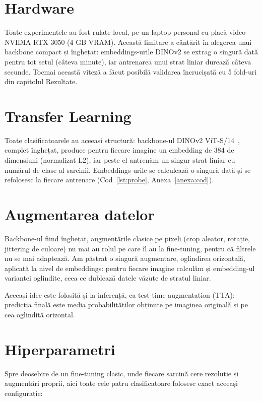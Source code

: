 \documentclass[12pt, a4paper, openany]{book}
\begin{document}
\section{Hardware}

Toate experimentele au fost rulate local, pe un laptop personal cu placă video NVIDIA RTX 3050 (4 GB VRAM). Această limitare a cântărit în alegerea unui backbone compact și înghețat: embeddings-urile DINOv2 se extrag o singură dată pentru tot setul (câteva minute), iar antrenarea unui strat liniar durează câteva secunde. Tocmai această viteză a făcut posibilă validarea încrucișată cu 5 fold-uri din capitolul Rezultate.
\section{Transfer Learning}

Toate clasificatoarele au aceeași structură: backbone-ul DINOv2 ViT-S/14~\cite{oquab2023dinov2}, complet înghețat, produce pentru fiecare imagine un embedding de 384 de dimensiuni (normalizat L2), iar peste el antrenăm un singur strat liniar cu numărul de clase al sarcinii. Embeddings-urile se calculează o singură dată și se refolosesc la fiecare antrenare (Cod~\ref{lst:probe}, Anexa~\ref{anexa:cod}).
\section{Augmentarea datelor}

Backbone-ul fiind înghețat, augmentările clasice pe pixeli (crop aleator, rotație, jittering de culoare) nu mai au rolul pe care îl au la fine-tuning, pentru că filtrele nu se mai adaptează. Am păstrat o singură augmentare, oglindirea orizontală, aplicată la nivel de embeddings: pentru fiecare imagine calculăm și embedding-ul variantei oglindite, ceea ce dublează datele văzute de stratul liniar.

Aceeași idee este folosită și la inferență, ca test-time augmentation (TTA): predicția finală este media probabilităților obținute pe imaginea originală și pe cea oglindită orizontal.

\section{Hiperparametri}

Spre deosebire de un fine-tuning clasic, unde fiecare sarcină cere rezoluție și augmentări proprii, aici toate cele patru clasificatoare folosesc exact aceeași configurație:
\end{document}
